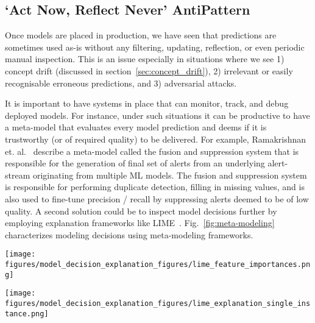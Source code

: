 \subsection{`Act Now, Reflect Never' AntiPattern}\label{sec:meta_modeling}
Once models are placed in production, we have seen that predictions are sometimes
used as-is without any filtering, updating, reflection, or even periodic manual inspection. This is an issue especially in situations where we see 1) concept drift (discussed in section~\ref{sec:concept_drift}), 2) irrelevant or easily recognisable erroneous predictions, and 3) adversarial attacks.

It is important to have systems in place that can monitor, track, and debug deployed models. For instance, under such situations it can be productive to have a meta-model that evaluates every model prediction and deems if it is trustworthy (or of required quality) to be delivered. For example, Ramakrishnan et. al.~\cite{beatingthenews} describe a meta-model called the fusion and suppression system that is responsible for the generation of final set of alerts from an underlying alert-stream originating from multiple ML models. The fusion and suppression system is responsible for performing duplicate detection, filling in missing values, and is also used to fine-tune precision / recall by suppressing alerts deemed to be of low quality.  A second solution could be to inspect model decisions further by employing explanation frameworks like LIME~\cite{ribeiro2016should}. Fig.~\ref{fig:meta-modeling} characterizes modeling decisions using meta-modeling frameworks.

\begin{figure*}[!ht]
    \begin{minipage}{0.45\textwidth}
            \texttt{[image: figures/model\_decision\_explanation\_figures/lime\_feature\_importances.png]}
    \end{minipage}
    \hfill
    \begin{minipage}{0.45\textwidth}
            \texttt{[image: figures/model\_decision\_explanation\_figures/lime\_explanation\_single\_instance.png]}
    \end{minipage}
    \caption{Inspecting Model Decisions using explanation
    frameworks. Demonstrated on churn (i.e., Attrition) detection application using the LIME~\cite{ribeiro2016should} framework.}
    \label{fig:meta-modeling}
\end{figure*}
